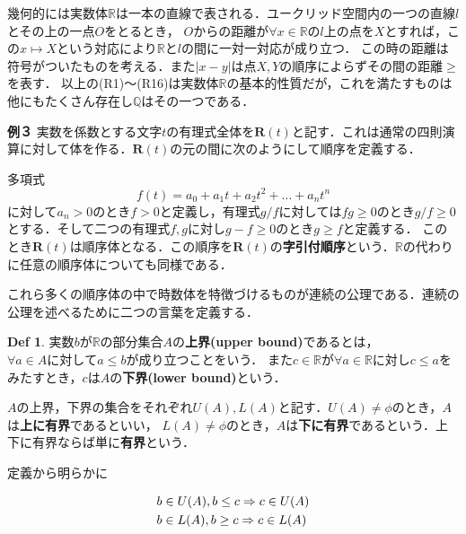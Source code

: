 \documentclass{ltjsarticle}
\theoremstyle{definition}
\newtheorem{definition}{Def}[subsection]
\theoremstyle{propcorollarystyle}
\theoremstyle{thmcorollarystyle}
\begin{document}
幾何的には実数体$\mathbb{R}$は一本の直線で表される．ユークリッド空間内の一つの直線$l$とその上の一点$O$をとるとき，
$O$からの距離が$\forall x \in \mathbb{R}$の$l$上の点を$X$とすれば，この$x \mapsto X$という対応により$\mathbb{R}とl$の間に一対一対応が成り立つ．
この時の距離は符号がついたものを考える．また$|x-y|は点X,Y$の順序によらずその間の距離$\ge$を表す．
以上の(R1)～(R16)は実数体$\mathbb{R}$の基本的性質だが，これを満たすものは他にもたくさん存在し$\mathbb{Q}$はその一つである．\par

\textbf{例３} 実数を係数とする文字$t$の有理式全体を$\bm{R}(t)$と記す．これは通常の四則演算に対して体を作る．$\bm{R}(t)$の元の間に次のようにして順序を定義する．\par
多項式
\begin{equation*}
  f(t)=a_{0}+a_{1}t+a_{2}t^{2}+\dots+a_{n}t^{n}
\end{equation*}
に対して$a_{n}>0のときf>0$と定義し，有理式$g/fに対してはfg \ge 0のときg/f \ge 0$とする．そして二つの有理式$f,gに対しg-f \ge 0のときg \ge f$と定義する．
このとき$\bm{R}(t)$は順序体となる．この順序を$\bm{R}(t)$の\textbf{字引付順序}という．$\mathbb{R}$の代わりに任意の順序体についても同様である．\par
\par

これら多くの順序体の中で時数体を特徴づけるものが連続の公理である．連続の公理を述べるために二つの言葉を定義する．\par
\begin{definition}
  実数$b$が$\mathbb{R}$の部分集合$A$の\textbf{上界(upper bound)}であるとは，$\forall a \in Aに対してa \le b$が成り立つことをいう．
  また$c \in \mathbb{R}$が$\forall a \in \mathbb{R}$に対し$c \le a$をみたすとき，$c$は$A$の\textbf{下界(lower bound)}という．
\end{definition}
$A$の上界，下界の集合をそれぞれ$U(A),L(A)$と記す．$U(A) \neq \phi$のとき，$A$は\textbf{上に有界}であるといい，
$L(A) \neq \phi$のとき，$A$は\textbf{下に有界}であるという．上下に有界ならば単に\textbf{有界}という．\par
定義から明らかに\par
\[
\makebox[0pt][l]{\hspace{-16.5em}\raisebox{0.3\baselineskip}{\text{(1.10)}}}
\begin{aligned}
  & b \in U(A),b \le c \Rightarrow c \in U(A)\\
  & b \in L(A),b \ge c \Rightarrow c \in L(A)  
\end{aligned}
\]
\end{document}
